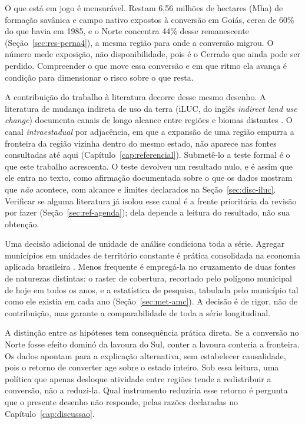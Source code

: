 O que está em jogo é mensurável. Restam 6,56 milhões de hectares (Mha) de
formação savânica e campo nativo expostos à conversão em Goiás, cerca de 60\%
do que havia em 1985, e o Norte concentra 44\% desse remanescente
(Seção~\ref{sec:res-perna4}), a mesma região para onde a conversão migrou. O número mede exposição, não
disponibilidade, pois é o Cerrado que ainda pode ser perdido. Compreender o que
move essa conversão e em que ritmo ela avança é condição para dimensionar o
risco sobre o que resta.

A contribuição do trabalho à literatura decorre desse mesmo desenho. A
literatura de mudança indireta de uso da terra (iLUC, do inglês
\emph{indirect land use change}) documenta canais de longo alcance entre
regiões e biomas distantes \cite{Lapola2010, Arima2011}. O canal
\emph{intraestadual} por adjacência, em que a expansão de uma região empurra
a fronteira da região vizinha dentro do mesmo estado, não aparece nas fontes
consultadas até aqui (Capítulo~\ref{cap:referencial}). Submetê-lo a teste
formal é o que este trabalho acrescenta. O teste devolveu um resultado nulo, e
é assim que ele entra no texto, como afirmação documentada sobre o que os
dados mostram que \emph{não} acontece, com alcance e limites declarados na
Seção~\ref{sec:disc-iluc}. Verificar se alguma literatura já isolou esse canal
é a frente prioritária da revisão por fazer
(Seção~\ref{sec:ref-agenda}); dela depende a leitura do resultado, não
sua obtenção.

Uma decisão adicional de unidade de análise condiciona toda a série. Agregar
municípios em unidades de território constante é prática consolidada na
economia aplicada brasileira \cite{Ehrl2017}. Menos frequente é empregá-la no
cruzamento de duas fontes de naturezas distintas: o raster de cobertura,
recortado pelo polígono municipal de hoje em todos os anos, e a estatística de
pesquisa, tabulada pelo município tal como ele existia em cada ano
(Seção~\ref{sec:met-amc}). A decisão é de rigor, não de contribuição, mas
garante a comparabilidade de toda a série longitudinal.

A distinção entre as hipóteses tem consequência prática direta. Se a conversão
no Norte fosse efeito dominó da lavoura do Sul, conter a lavoura conteria a
fronteira. Os dados apontam para a explicação alternativa, sem estabelecer
causalidade, pois o retorno de converter age sobre o estado inteiro. Sob essa
leitura, uma política que apenas desloque atividade entre regiões tende a
redistribuir a conversão, não a reduzi-la. Qual instrumento reduziria esse
retorno é pergunta que o presente desenho não responde, pelas razões
declaradas no Capítulo~\ref{cap:discussao}.

